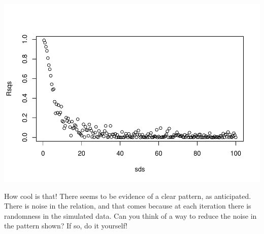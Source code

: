 \documentclass[
]{book}
\newenvironment{Shaded}{\begin{snugshade}}{\end{snugshade}}
\newcommand{\AttributeTok}[1]{\textcolor[rgb]{0.13,0.29,0.53}{#1}}
\newcommand{\CommentTok}[1]{\textcolor[rgb]{0.56,0.35,0.01}{\textit{#1}}}
\newcommand{\ControlFlowTok}[1]{\textcolor[rgb]{0.13,0.29,0.53}{\textbf{#1}}}
\newcommand{\DecValTok}[1]{\textcolor[rgb]{0.00,0.00,0.81}{#1}}
\newcommand{\FloatTok}[1]{\textcolor[rgb]{0.00,0.00,0.81}{#1}}
\newcommand{\FunctionTok}[1]{\textcolor[rgb]{0.13,0.29,0.53}{\textbf{#1}}}
\newcommand{\NormalTok}[1]{#1}
\newcommand{\OtherTok}[1]{\textcolor[rgb]{0.56,0.35,0.01}{#1}}
\newcommand{\SpecialCharTok}[1]{\textcolor[rgb]{0.81,0.36,0.00}{\textbf{#1}}}
\begin{document}
\begin{Shaded}
\end{Shaded}

\includegraphics{ECOMODbook_files/figure-latex/a6.31-1.pdf}

How cool is that! There seems to be evidence of a clear pattern, as anticipated. There is noise in the relation, and that comes because at each iteration there is randomness in the simulated data. Can you think of a way to reduce the noise in the pattern shown? If so, do it yourself!
\end{document}
